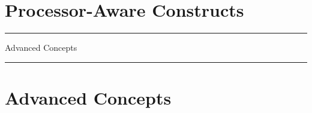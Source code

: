 \documentclass[10pt]{article}
\begin{document}
\section{Processor-Aware Constructs}
  
  

\begin{titlepage}%
 \rule{\textwidth}{3pt}
 \vspace{\fill}
 \begin{flushright}
   \textsf{\Huge Advanced Concepts \\}
 \end{flushright}
 \vspace{\fill}
 \rule{\textwidth}{3pt}
\end{titlepage}

\section{Advanced Concepts}

  
  
  
  
  
  
  
  
  
  
      
      
%  
  
  



%






\appendix


%






\end{document}
